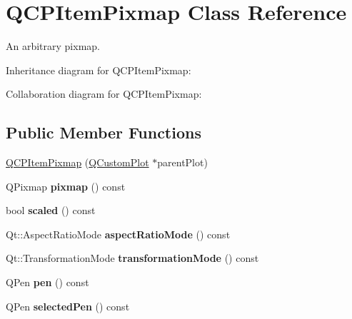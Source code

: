 \hypertarget{classQCPItemPixmap}{}\section{Q\+C\+P\+Item\+Pixmap Class Reference}
\label{classQCPItemPixmap}


An arbitrary pixmap.  




Inheritance diagram for Q\+C\+P\+Item\+Pixmap\+:


Collaboration diagram for Q\+C\+P\+Item\+Pixmap\+:
\subsection*{Public Member Functions}
\begin{DoxyCompactItemize}
\item 
\hyperlink{classQCPItemPixmap_aa6de42a37261b21a5480e7da122345c3}{Q\+C\+P\+Item\+Pixmap} (\hyperlink{classQCustomPlot}{Q\+Custom\+Plot} $\ast$parent\+Plot)
\item 
Q\+Pixmap {\bfseries pixmap} () const \hypertarget{classQCPItemPixmap_a73dea89e0eb45127a2705e2c7991b8d8}{}\label{classQCPItemPixmap_a73dea89e0eb45127a2705e2c7991b8d8}

\item 
bool {\bfseries scaled} () const \hypertarget{classQCPItemPixmap_a54026b89dff3c60376c2360f01b6fb83}{}\label{classQCPItemPixmap_a54026b89dff3c60376c2360f01b6fb83}

\item 
Qt\+::\+Aspect\+Ratio\+Mode {\bfseries aspect\+Ratio\+Mode} () const \hypertarget{classQCPItemPixmap_ac5b95c097169e107a61eebbb7c77523c}{}\label{classQCPItemPixmap_ac5b95c097169e107a61eebbb7c77523c}

\item 
Qt\+::\+Transformation\+Mode {\bfseries transformation\+Mode} () const \hypertarget{classQCPItemPixmap_a1d4751a7b9588354fc8e726d891153f7}{}\label{classQCPItemPixmap_a1d4751a7b9588354fc8e726d891153f7}

\item 
Q\+Pen {\bfseries pen} () const \hypertarget{classQCPItemPixmap_ab2b821c80cfade589472e933b9c4361f}{}\label{classQCPItemPixmap_ab2b821c80cfade589472e933b9c4361f}

\item 
Q\+Pen {\bfseries selected\+Pen} () const \hypertarget{classQCPItemPixmap_af8e839d7c7b84e214608feda3caec2bc}{}\label{classQCPItemPixmap_af8e839d7c7b84e214608feda3caec2bc}


\end{DoxyCompactItemize}

